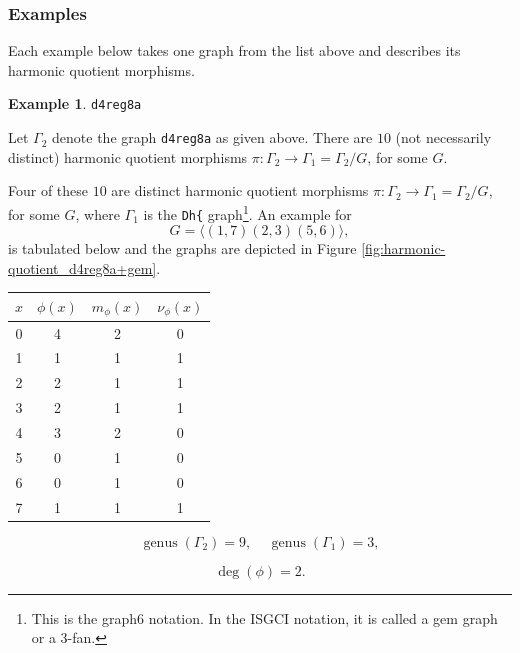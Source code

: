 \documentclass[12pt,letterpaper]{article}
\theoremstyle{definition}
\newtheorem{example}[theorem]{Example}
\DeclareMathOperator{\genus}{genus}
\begin{document}
\subsubsection{Examples}

Each example below takes one graph from the list above and describes
its harmonic quotient morphisms.


\begin{example}%
\label{example:d4reg8a}
 {\tt d4reg8a}\newline
{\rm  
  Let $\Gamma_2$ denote the graph {\tt d4reg8a} as given above.
There are $10$ (not necessarily distinct) harmonic quotient morphisms
$\pi: \Gamma_2\to \Gamma_1=\Gamma_2/G$,
for some $G$.

Four of these $10$ are distinct harmonic quotient morphisms
$\pi: \Gamma_2\to \Gamma_1=\Gamma_2/G$,
for some $G$, where $\Gamma_1$ is the \verb+Dh{+ graph\footnote{This is the graph6 notation. In the ISGCI notation, it is called a gem graph or a $3$-fan.}.
An example for
\[
G = \langle  (1,7)(2,3)(5,6)\rangle,
\]
is tabulated below and the graphs are depicted in
Figure \ref{fig:harmonic-quotient_d4reg8a+gem}.

\begin{center}
\begin{tabular}{c|c|c|c}  
  $x$ & $\phi(x)$ & $m_\phi(x)$ & $\nu_\phi(x)$ \\ \hline
  0   &    4   &        2         &  0   \\ 
  1   &    1   &        1         &  1  \\ 
  2   &    2   &        1         &  1  \\ 
  3   &    2   &        1         &  1  \\ 
  4   &    3   &        2         &  0   \\
  5   &    0   &        1         &  0   \\
  6   &    0   &        1         &  0   \\
  7   &    1   &        1         &  1   \\     
\end{tabular}
\end{center}

\[
  \genus(\Gamma_2) =9,\ \ \ \ \
  \genus(\Gamma_1) =3,
\]

\[
\deg(\phi) =2.
\]

}
\end{example}
\end{document}
